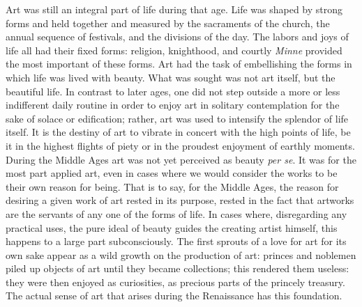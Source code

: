 Art was still an integral part of life during that age. Life was shaped
by strong forms and held together and measured by the sacraments of the
church, the annual sequence of festivals, and the divisions of the day.
The labors and joys of life all had their fixed forms: religion,
knighthood, and courtly \emph{Minne} provided the most important of
these forms. Art had the task of embellishing the forms in which life
was lived with beauty. What was sought was not art itself, but the
beautiful life. In contrast to later ages, one did not step outside a
more or less indifferent daily routine in order to enjoy art in solitary
contemplation for the sake of solace or edification; rather, art was
used to intensify the splendor of life itself. It is the destiny of art
to vibrate in concert with the high points of life, be it in the highest
flights of piety or in the proudest enjoyment of earthly moments. During
the Middle Ages art was not yet perceived as beauty \emph{per se}. It
was for the most part applied art, even in cases where we would consider
the works to be their own reason for being. That is to say, for the
Middle Ages, the reason for desiring a given work of art rested in its
purpose, rested in the fact that artworks are the servants of any one of
the forms of life. In cases where, disregarding any practical uses, the
pure ideal of beauty guides the creating artist himself, this happens to
a large part subconsciously. The first sprouts of a love for art for its
own sake appear as a wild growth on the production of art: princes and
noblemen piled up objects of art until they became collections; this
rendered them useless: they were then enjoyed as curiosities,
\protect\hypertarget{19_Chapter_Twelve__ART_IN_LIFE.xhtmlux5cux23page_297}{}{}as
precious parts of the princely treasury. The actual sense of art that
arises during the Renaissance has this foundation.

